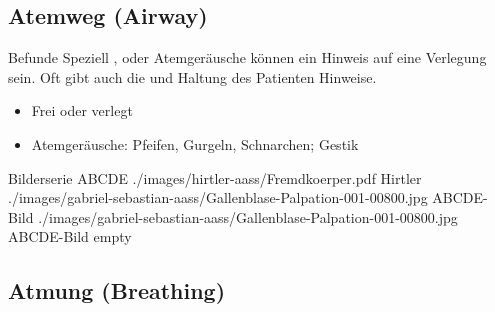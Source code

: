 \clearpage
\subsection{{} Atemweg (Airway)}

{}
{}
{}

{{\eye} Befunde}
{Speziell ,  oder 
Atemgeräusche können ein Hinweis auf eine Verlegung sein.
Oft gibt auch die  und Haltung des Patienten
Hinweise.
}
{
\begin{itemize}
  \item[→] Frei oder verlegt
  \item[\eye] Atemgeräusche: Pfeifen, Gurgeln, Schnarchen;
  Gestik
\end{itemize}
}
{}
{}
{}

\begin{PictureSeriesWide}{}{Bilderserie ABCDE}
{./images/hirtler-aass/Fremdkoerper.pdf}
{Hirtler}
{./images/gabriel-sebastian-aass/Gallenblase-Palpation-001-00800.jpg}
{ABCDE-Bild}
{./images/gabriel-sebastian-aass/Gallenblase-Palpation-001-00800.jpg}
{ABCDE-Bild}
{empty}
{}
\end{PictureSeriesWide}


\clearpage
\subsection{{} Atmung (Breathing)}

